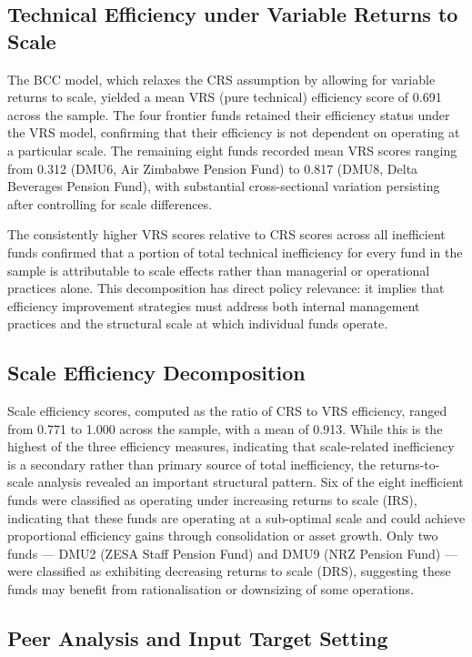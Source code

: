 \documentclass[12pt,a4paper]{article}
\begin{document}
\subsection{Technical Efficiency under Variable Returns to Scale}

The BCC model, which relaxes the CRS assumption by allowing for variable returns to scale, yielded a mean VRS (pure technical) efficiency score of 0.691 across the sample. The four frontier funds retained their efficiency status under the VRS model, confirming that their efficiency is not dependent on operating at a particular scale. The remaining eight funds recorded mean VRS scores ranging from 0.312 (DMU6, Air Zimbabwe Pension Fund) to 0.817 (DMU8, Delta Beverages Pension Fund), with substantial cross-sectional variation persisting after controlling for scale differences.

The consistently higher VRS scores relative to CRS scores across all inefficient funds confirmed that a portion of total technical inefficiency for every fund in the sample is attributable to scale effects rather than managerial or operational practices alone. This decomposition has direct policy relevance: it implies that efficiency improvement strategies must address both internal management practices and the structural scale at which individual funds operate.

\subsection{Scale Efficiency Decomposition}

Scale efficiency scores, computed as the ratio of CRS to VRS efficiency, ranged from 0.771 to 1.000 across the sample, with a mean of 0.913. While this is the highest of the three efficiency measures, indicating that scale-related inefficiency is a secondary rather than primary source of total inefficiency, the returns-to-scale analysis revealed an important structural pattern. Six of the eight inefficient funds were classified as operating under increasing returns to scale (IRS), indicating that these funds are operating at a sub-optimal scale and could achieve proportional efficiency gains through consolidation or asset growth. Only two funds --- DMU2 (ZESA Staff Pension Fund) and DMU9 (NRZ Pension Fund) --- were classified as exhibiting decreasing returns to scale (DRS), suggesting these funds may benefit from rationalisation or downsizing of some operations.

\subsection{Peer Analysis and Input Target Setting}
\end{document}
